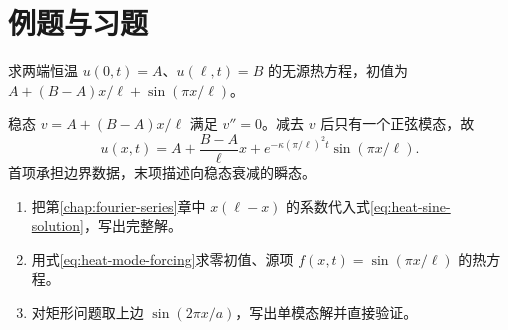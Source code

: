 \section{例题与习题}
\begin{example}
求两端恒温 $u(0,t)=A$、$u(\ell,t)=B$ 的无源热方程，初值为 $A+(B-A)x/\ell+\sin(\pi x/\ell)$。
\end{example}
\begin{solve}
稳态 $v=A+(B-A)x/\ell$ 满足 $v''=0$。减去 $v$ 后只有一个正弦模态，故
\[
 u(x,t)=A+\frac{B-A}{\ell}x+e^{-\kappa(\pi/\ell)^2t}\sin(\pi x/\ell).
\]
首项承担边界数据，末项描述向稳态衰减的瞬态。
\end{solve}
\begin{enumerate}
 \item 把第\ref{chap:fourier-series}章中 $x(\ell-x)$ 的系数代入式\eqref{eq:heat-sine-solution}，写出完整解。
 \item 用式\eqref{eq:heat-mode-forcing}求零初值、源项 $f(x,t)=\sin(\pi x/\ell)$ 的热方程。
 \item 对矩形问题取上边 $\sin(2\pi x/a)$，写出单模态解并直接验证。
\end{enumerate}

